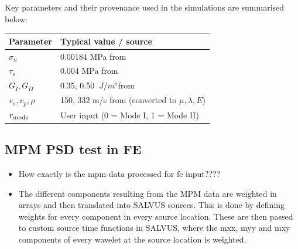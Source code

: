 \documentclass[10pt]{article}
\begin{document}
Key parameters and their provenance used in the simulations are summarised below:
\begin{center}
\begin{tabular}{ll}
\hline
Parameter & Typical value / source \\
\hline
$\sigma_n$ & 0.00184 MPa from \cite{mahajanModelingInterfacialCrack2008} \\
$\tau_s$ & 0.004 MPa from \cite{mahajanModelingInterfacialCrack2008} \\
$G_I, G_{II}$ & 0.35, 0.50 $\ J/m^s$from \cite{mahajanModelingInterfacialCrack2008} \\
$v_s, v_p, \rho$ & 150, 332 m/s from \cite{guillemotEffectSnowfallChanges2021} (converted to $\mu,\lambda,E$) \\
$r_{\rm mode}$ & User input (0 = Mode I, 1 = Mode II) \\
\hline
\end{tabular}
\end{center}

\subsection{MPM PSD test in FE}
\begin{itemize}
  \item How exactly is the mpm data processed for fe input????
  \item The different components resulting from the MPM data are weighted in arrays and then translated into SALVUS sources. This is done by defining weights for every component in every source location. These are then passed to custom source time functions in SALVUS, where the mxx, myy and mxy components of every wavelet at the source location is weighted. 
\end{itemize}


\end{document}
